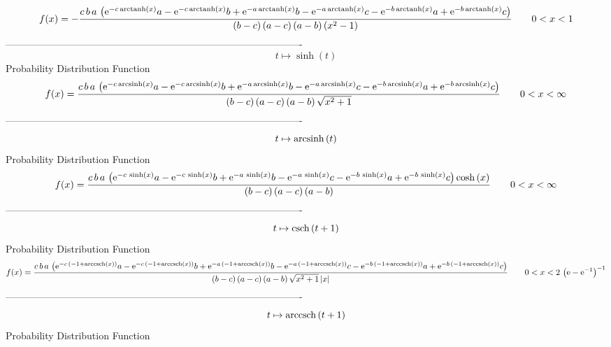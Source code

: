 \documentclass[12pt]{article}
\begin{document}
$$  f(x)=-{\frac {c\,b\,a\, \left( {{\rm e}^{-c\,{\rm arctanh} \left(x\right)}}
a-{{\rm e}^{-c\,{\rm arctanh} \left(x\right)}}b+{{\rm e}^{-a\,
{\rm arctanh} \left(x\right)}}b-{{\rm e}^{-a\,{\rm arctanh} \left(x
\right)}}c-{{\rm e}^{-b\,{\rm arctanh} \left(x\right)}}a+{{\rm e}^{-b
\,{\rm arctanh} \left(x\right)}}c \right) }{ \left( b-c \right) 
 \left( a-c \right)  \left( a-b \right)  \left( {x}^{2}-1 \right) }}
 \qquad0
 < x < 1
$$-------------------------------------------------------------------------------------------  \\$$t\mapsto \sinh \left( t \right) 
$$Probability Distribution Function 
$$  f(x)={\frac {c\,b\,a\, \left( {{\rm e}^{-c\,{\rm arcsinh} \left(x\right)}}a
-{{\rm e}^{-c\,{\rm arcsinh} \left(x\right)}}b+{{\rm e}^{-a\,
{\rm arcsinh} \left(x\right)}}b-{{\rm e}^{-a\,{\rm arcsinh} \left(x
\right)}}c-{{\rm e}^{-b\,{\rm arcsinh} \left(x\right)}}a+{{\rm e}^{-b
\,{\rm arcsinh} \left(x\right)}}c \right) }{ \left( b-c \right) 
 \left( a-c \right)  \left( a-b \right) \sqrt {{x}^{2}+1}}}
 \qquad0
 < x < \infty 
$$-------------------------------------------------------------------------------------------  \\$$t\mapsto {\rm arcsinh} \left(t\right)
$$Probability Distribution Function 
$$  f(x)={\frac {c\,b\,a\, \left( {{\rm e}^{-c\,\sinh \left( x \right) }}a-{
{\rm e}^{-c\,\sinh \left( x \right) }}b+{{\rm e}^{-a\,\sinh \left( x
 \right) }}b-{{\rm e}^{-a\,\sinh \left( x \right) }}c-{{\rm e}^{-b\,
\sinh \left( x \right) }}a+{{\rm e}^{-b\,\sinh \left( x \right) }}c
 \right) \cosh \left( x \right) }{ \left( b-c \right)  \left( a-c
 \right)  \left( a-b \right) }}
 \qquad0
 < x < \infty 
$$-------------------------------------------------------------------------------------------  \\$$t\mapsto {\rm csch} \left(t+1\right)
$$Probability Distribution Function 
$$  f(x)={\frac {c\,b\,a\, \left( {{\rm e}^{-c\, \left( -1+{\rm arccsch} \left(
x\right) \right) }}a-{{\rm e}^{-c\, \left( -1+{\rm arccsch} \left(x
\right) \right) }}b+{{\rm e}^{-a\, \left( -1+{\rm arccsch} \left(x
\right) \right) }}b-{{\rm e}^{-a\, \left( -1+{\rm arccsch} \left(x
\right) \right) }}c-{{\rm e}^{-b\, \left( -1+{\rm arccsch} \left(x
\right) \right) }}a+{{\rm e}^{-b\, \left( -1+{\rm arccsch} \left(x
\right) \right) }}c \right) }{ \left( b-c \right)  \left( a-c \right) 
 \left( a-b \right) \sqrt {{x}^{2}+1} \left| x \right| }}
 \qquad0
 < x < 2\, \left( {\rm e}-{{\rm e}^{-1}} \right) ^{-1}
$$-------------------------------------------------------------------------------------------  \\$$t\mapsto {\rm arccsch} \left(t+1\right)
$$Probability Distribution Function 
\end{document}
